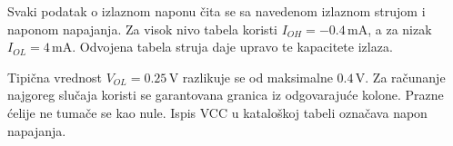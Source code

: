 Svaki podatak o izlaznom naponu čita se sa navedenom izlaznom strujom i naponom napajanja. Za visok nivo tabela koristi $I_{OH}=-0.4\,\mathrm{mA}$, a za nizak $I_{OL}=4\,\mathrm{mA}$. Odvojena tabela struja daje upravo te kapacitete izlaza.

Tipična vrednost $V_{OL}=0.25\,\mathrm V$ razlikuje se od maksimalne $0.4\,\mathrm V$. Za računanje najgoreg slučaja koristi se garantovana granica iz odgovarajuće kolone. Prazne ćelije ne tumače se kao nule. Ispis VCC u kataloškoj tabeli označava napon napajanja.

